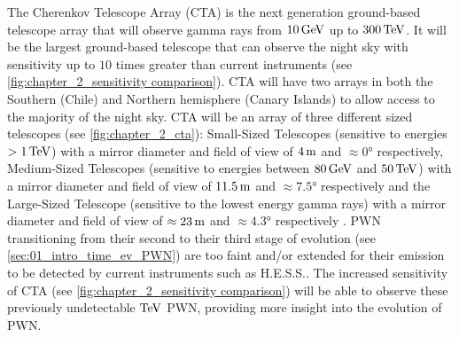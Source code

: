 The Cherenkov Telescope Array (CTA) is the next generation ground-based telescope array that will observe gamma rays from $10\,\si{\giga\electronvolt}$ up to $300\,\TeV$. It will be the largest ground-based telescope that can observe the night sky with sensitivity up to $10$ times greater than current instruments (see \autoref{fig:chapter_2_sensitivity comparison}). CTA will have two arrays in both the Southern (Chile) and Northern hemisphere (Canary Islands) to allow access to the majority of the night sky.
\newpar
CTA will be an array of three different sized telescopes (see \autoref{fig:chapter_2_cta}): Small-Sized Telescopes (sensitive to energies $>1\,\TeV$) with a mirror diameter and field of view of $4\,\si{\meter}$ and $\approx\ang{0}$ respectively, Medium-Sized Telescopes (sensitive to energies between $80\,\si{\giga\electronvolt}$ and $50\,\TeV$) with a mirror diameter and field of view of $11.5\,\si{\meter}$ and $\approx\ang{7.5}$ respectively and the Large-Sized Telescope (sensitive to the lowest energy gamma rays) with a mirror diameter and field of view of $\approx 23\,\si{\meter}$ and $\approx\ang{4.3}$ respectively \citep{cherenkov_telescope_array,2019scta.book.....C}.
\newpar
PWN transitioning from their second to their third stage of evolution (see \autoref{sec:01_intro_time_ev_PWN}) are too faint and/or extended for their emission to be detected by current instruments such as H.E.S.S.. The increased sensitivity of CTA (see \autoref{fig:chapter_2_sensitivity comparison}) will be able to observe these previously undetectable $\TeV$ PWN, providing more insight into the evolution of PWN.